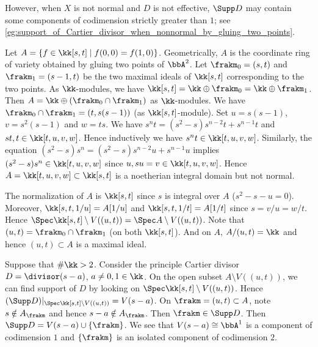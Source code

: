   \begin{remark}
    However, when $X$ is not normal and $D$ is not effective, $\Supp D$ may contain some components of codimension strictly greater than $1$; see \cref{eg:support_of_Cartier_divisor_when_nonnormal_by_gluing_two_points}.
  \end{remark}

  \begin{example}\label{eg:support_of_Cartier_divisor_when_nonnormal_by_gluing_two_points}
    Let $A = \{f \in \kk[s,t] \mid f(0,0) = f(1,0)\}$.
    Geometrically, $A$ is the coordinate ring of variety obtained by gluing two points of $\bbA^2$.
    Let $\frakm_0 = (s,t)$ and $\frakm_1 = (s-1,t)$ be the two maximal ideals of $\kk[s,t]$ corresponding to the two points.
    As $\kk$-modules, we have $\kk[s,t] = \kk \oplus \frakm_0 = \kk \oplus \frakm_1$.
    Then $A = \kk \oplus (\frakm_0 \cap \frakm_1)$ as $\kk$-modules.
    We have $\frakm_0 \cap \frakm_1 = (t, s(s-1))$ (as $\kk[s,t]$-module).
    Set $u = s(s-1)$, $v = s^2(s-1)$ and $w = ts$.
    We have $s^nt = (s^2-s)s^{n-2}t + s^{n-1}t$ and $st,t \in \kk[t,u,v,w]$.
    Hence inductively we have $s^{n}t \in \kk[t,u,v,w]$.
    Similarly, the equation $(s^2-s)s^{n} = (s^2-s)s^{n-2}u+s^{n-1}u$ implies $(s^2-s)s^{n} \in \kk[t,u,v,w]$ since $u,su = v \in \kk[t,u,v,w]$.
    Hence $A = \kk[t,u,v,w] \subset \kk[s,t]$ is a noetherian integral domain but not normal.

    The normalization of $A$ is $\kk[s,t]$ since $s$ is integral over $A$ ($s^2-s-u=0$).
    Moreover, $\kk[s,t,1/u]=A[1/u]$ and $\kk[s,t,1/t]=A[1/t]$ since $s=v/u = w/t$.
    Hence $\Spec \kk[s,t] \setminus V((u,t)) = \Spec A \setminus V((u,t))$.
    Note that $(u,t) = \frakm_0 \cap \frakm_1$ (on both $\kk[s,t]$).
    And on $A$, $A/(u,t) = \kk$ and hence $(u,t) \subset A$ is a maximal ideal.

    Suppose that $\# \kk > 2$.
    Consider the principle Cartier divisor $D = \divisor (s-a)$, $a \neq 0,1 \in \kk$.
    On the open subset $A \setminus V((u,t))$, we can find support of $D$ by looking on $\Spec \kk[s,t] \setminus V((u,t))$.
    Hence $(\Supp D)|_{\Spec \kk[s,t] \setminus V((u,t))} = V(s-a)$.
    On $\frakm = (u,t) \subset A$, note $s \notin A_{\frakm}$ and hence $s-a \notin A_\frakm$.
    Then $\frakm \in \Supp D$.
    Then $\Supp D = V(s-a) \cup \{\frakm\}$.
    We see that $V(s-a) \cong \bbA^1$ is a component of codimension $1$ and $\{\frakm\}$ is an isolated component of codimension $2$.
  \end{example}

